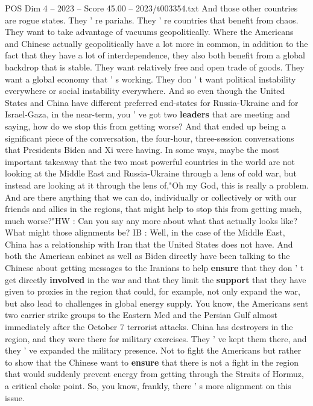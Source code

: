 \begin{textsample}{POS Dim 4 – 2023 – Score 45.00 – 2023/t003354.txt}
And those other countries are rogue states.
They ' re pariahs.
They ' re countries that benefit from chaos.
They want to take advantage of vacuums geopolitically.
Where the Americans and Chinese actually geopolitically have a lot more in common, in addition to the fact that they have a lot of interdependence, they also both benefit from a global backdrop that is stable.
They want relatively free and open trade of goods.
They want a global economy that ' s working.
They don ' t want political instability everywhere or social instability everywhere.
And so even though the United States and China have different preferred end-states for Russia-Ukraine and for Israel-Gaza, in the near-term, you ' ve got two \textbf{leaders} that are meeting and saying, how do we stop this from getting worse?
And that ended up being a significant piece of the conversation, the four-hour, three-session conversations that Presidents Biden and Xi were having.
In some ways, maybe the most important takeaway that the two most powerful countries in the world are not looking at the Middle East and Russia-Ukraine through a lens of cold war, but instead are looking at it through the lens of,"Oh my God, this is really a problem.
And are there anything that we can do, individually or collectively or with our friends and allies in the regions, that might help to stop this from getting much, much worse?"HW : Can you say any more about what that actually looks like?
What might those alignments be?
IB : Well, in the case of the Middle East, China has a relationship with Iran that the United States does not have.
And both the American cabinet as well as Biden directly have been talking to the Chinese about getting messages to the Iranians to help \textbf{ensure} that they don ' t get directly \textbf{involved} in the war and that they limit the \textbf{support} that they have given to proxies in the region that could, for example, not only expand the war, but also lead to challenges in global energy supply.
You know, the Americans sent two carrier strike groups to the Eastern Med and the Persian Gulf almost immediately after the October 7 terrorist attacks.
China has destroyers in the region, and they were there for military exercises.
They ' ve kept them there, and they ' ve expanded the military presence.
Not to fight the Americans but rather to show that the Chinese want to \textbf{ensure} that there is not a fight in the region that would suddenly prevent energy from getting through the Straits of Hormuz, a critical choke point.
So, you know, frankly, there ' s more alignment on this issue.

\end{textsample}
